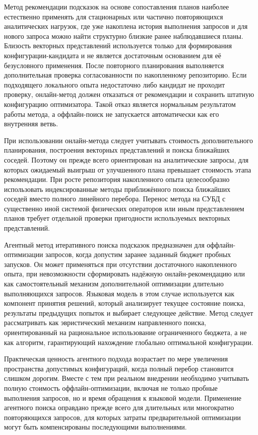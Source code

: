 Метод рекомендации подсказок на основе сопоставления планов наиболее естественно применять для стационарных или частично повторяющихся аналитических нагрузок, где уже накоплена история выполнения запросов и для нового запроса можно найти структурно близкие ранее наблюдавшиеся планы. Близость векторных представлений используется только для формирования конфигурации-кандидата и не является достаточным основанием для её безусловного применения. После повторного планирования выполняется дополнительная проверка согласованности по накопленному репозиторию. Если подходящего локального опыта недостаточно либо кандидат не проходит проверку, онлайн-метод должен отказаться от рекомендации и сохранить штатную конфигурацию оптимизатора. Такой отказ является нормальным результатом работы метода, а оффлайн-поиск не запускается автоматически как его внутренняя ветвь.

При использовании онлайн-метода следует учитывать стоимость дополнительного планирования, построения векторных представлений и поиска ближайших соседей. Поэтому он прежде всего ориентирован на аналитические запросы, для которых ожидаемый выигрыш от улучшенного плана превышает стоимость этапа рекомендации. При росте репозитория накопленного опыта целесообразно использовать индексированные методы приближённого поиска ближайших соседей вместо полного линейного перебора. Перенос метода на СУБД с существенно иной системой физических операторов или иным представлением планов требует отдельной проверки пригодности используемых векторных представлений.

Агентный метод итеративного поиска подсказок предназначен для оффлайн-оптимизации запросов, когда допустим заранее заданный бюджет пробных запусков. Он может применяться при отсутствии достаточного накопленного опыта, при невозможности сформировать надёжную онлайн-рекомендацию или как самостоятельный механизм дополнительной оптимизации длительно выполняющихся запросов. Языковая модель в этом случае используется как компонент принятия решений, который анализирует текущее состояние поиска, результаты предыдущих попыток и выбирает следующее действие. Метод следует рассматривать как эвристический механизм направленного поиска, ориентированный на рациональное использование ограниченного бюджета, а не как алгоритм, гарантирующий нахождение глобально оптимальной конфигурации.

Практическая ценность агентного подхода возрастает по мере увеличения пространства допустимых конфигураций, когда полный перебор становится слишком дорогим. Вместе с тем при реальном внедрении необходимо учитывать полную стоимость оффлайн-оптимизации, включая не только пробные выполнения запросов, но и время обращения к языковой модели. Применение агентного поиска оправдано прежде всего для длительных или многократно повторяющихся запросов, для которых затраты предварительной оптимизации могут быть компенсированы последующими выполнениями.

